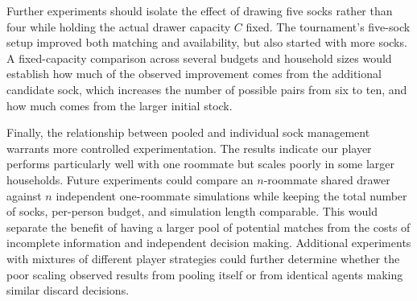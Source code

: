 \documentclass[11pt]{article}
\begin{document}
Further experiments should isolate the effect of drawing five socks rather than four while holding the actual drawer capacity \(C\) fixed. The tournament's five-sock setup improved both matching and availability, but also started with more socks. A fixed-capacity comparison across several budgets and household sizes would establish how much of the observed improvement comes from the additional candidate sock, which increases the number of possible pairs from six to ten, and how much comes from the larger initial stock.

Finally, the relationship between pooled and individual sock management warrants more controlled experimentation. The results indicate our player performs particularly well with one roommate but scales poorly in some larger households. Future experiments could compare an \(n\)-roommate shared drawer against \(n\) independent one-roommate simulations while keeping the total number of socks, per-person budget, and simulation length comparable. This would separate the benefit of having a larger pool of potential matches from the costs of incomplete information and independent decision making. Additional experiments with mixtures of different player strategies could further determine whether the poor scaling observed results from pooling itself or from identical agents making similar discard decisions.

\clearpage
\appendix

\end{document}
